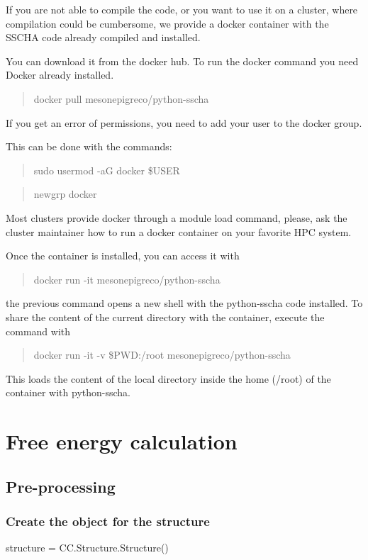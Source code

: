 \documentclass[]{report}
\begin{document}
If you are not able to compile the code, or you want to use it on a cluster, where compilation could be cumbersome, we provide a docker container with the SSCHA code already compiled and installed.

You can download it from the docker hub. To run the docker command you need Docker already installed.

\begin{quotation}
	docker pull mesonepigreco/python-sscha
\end{quotation}

If you get an error of permissions, you need to add your user to the docker group.

This can be done with the commands:

\begin{quotation}
	sudo usermod -aG docker \$USER
\end{quotation}
	
\begin{quotation}
		newgrp docker
\end{quotation}


Most clusters provide docker through a module load command, please, ask the cluster maintainer how to run a docker container on your favorite HPC system.

Once the container is installed, you can access it with

\begin{quotation}
	docker run -it mesonepigreco/python-sscha
\end{quotation}

the previous command opens a new shell with the python-sscha code installed. To share the content of the current directory with the container, execute the command with

\begin{quotation}
	docker run -it -v \$PWD:/root mesonepigreco/python-sscha
\end{quotation}

This loads the content of the local directory inside the home (/root) of the container with python-sscha.
\chapter{Free energy calculation}
\section{Pre-processing}
\subsection{Create the object for the structure}
structure = CC.Structure.Structure()
\end{document}
